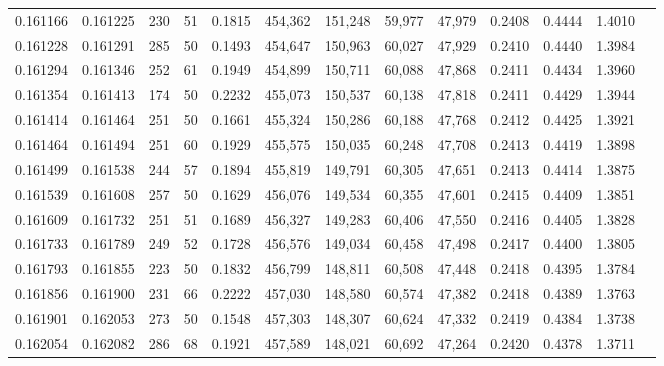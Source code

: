 \begin{tabular}{rrrrrrrrrrrrr}
0.161166 & 0.161225 &   230 &  51 &                                     0.1815 & 454,362 & 151,248 &  59,977 &  47,979 & 0.2408 & 0.4444 & 1.4010 \\
0.161228 & 0.161291 &   285 &  50 &                                     0.1493 & 454,647 & 150,963 &  60,027 &  47,929 & 0.2410 & 0.4440 & 1.3984 \\
0.161294 & 0.161346 &   252 &  61 &                                     0.1949 & 454,899 & 150,711 &  60,088 &  47,868 & 0.2411 & 0.4434 & 1.3960 \\
0.161354 & 0.161413 &   174 &  50 &                                     0.2232 & 455,073 & 150,537 &  60,138 &  47,818 & 0.2411 & 0.4429 & 1.3944 \\
0.161414 & 0.161464 &   251 &  50 &                                     0.1661 & 455,324 & 150,286 &  60,188 &  47,768 & 0.2412 & 0.4425 & 1.3921 \\
0.161464 & 0.161494 &   251 &  60 &                                     0.1929 & 455,575 & 150,035 &  60,248 &  47,708 & 0.2413 & 0.4419 & 1.3898 \\
0.161499 & 0.161538 &   244 &  57 &                                     0.1894 & 455,819 & 149,791 &  60,305 &  47,651 & 0.2413 & 0.4414 & 1.3875 \\
0.161539 & 0.161608 &   257 &  50 &                                     0.1629 & 456,076 & 149,534 &  60,355 &  47,601 & 0.2415 & 0.4409 & 1.3851 \\
0.161609 & 0.161732 &   251 &  51 &                                     0.1689 & 456,327 & 149,283 &  60,406 &  47,550 & 0.2416 & 0.4405 & 1.3828 \\
0.161733 & 0.161789 &   249 &  52 &                                     0.1728 & 456,576 & 149,034 &  60,458 &  47,498 & 0.2417 & 0.4400 & 1.3805 \\
0.161793 & 0.161855 &   223 &  50 &                                     0.1832 & 456,799 & 148,811 &  60,508 &  47,448 & 0.2418 & 0.4395 & 1.3784 \\
0.161856 & 0.161900 &   231 &  66 &                                     0.2222 & 457,030 & 148,580 &  60,574 &  47,382 & 0.2418 & 0.4389 & 1.3763 \\
0.161901 & 0.162053 &   273 &  50 &                                     0.1548 & 457,303 & 148,307 &  60,624 &  47,332 & 0.2419 & 0.4384 & 1.3738 \\
0.162054 & 0.162082 &   286 &  68 &                                     0.1921 & 457,589 & 148,021 &  60,692 &  47,264 & 0.2420 & 0.4378 & 1.3711 \\

\end{tabular}
